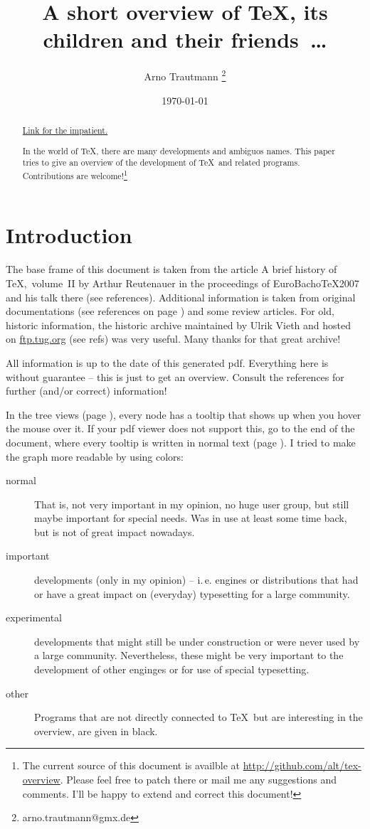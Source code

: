 \documentclass{scrartcl}
\title{A short overview of \TeX, its children and their friends~\dots}
\author{Arno Trautmann \thanks{arno.trautmann@gmx.de}}
\date{\today}
\begin{document}
\maketitle

\begin{abstract}
\centerline{\hyperref[textextview]{Link for the impatient.}}
In the world of \TeX, there are many developments and ambiguos names. This paper tries to give an overview of the development of \TeX\ and related programs. Contributions are welcome!\footnote{The current source of this document is availble at \url{http://github.com/alt/tex-overview}. Please feel free to patch there or mail me any suggestions and comments. I’ll be happy to extend and correct this document!}\\
\end{abstract}

\section*{Introduction}
The base frame of this document is taken from the article \textsf{A brief history of \TeX,~volume~II} by Arthur Reutenauer in the proceedings of \textsf{EuroBacho\TeX 2007} and his talk there (see references). Additional information is taken from original documentations (see references on page \pageref{sec:refs}) and some review articles. For old, historic information, the \textsf{historic archive} maintained by Ulrik Vieth and hosted on \url{ftp.tug.org} (see refs) was very useful. Many thanks for that great archive!

All information is up to the date of this generated pdf. Everything here is without guarantee – this is just to get an overview. Consult the references for further (and/or correct) information! 

In the tree views (page \pageref{sec:tree}), every node has a tooltip that shows up when you hover the mouse over it. If your pdf viewer does not support this, go to the end of the document, where every tooltip is written in normal text (page \pageref{sec:text}). I tried to make the graph more readable by using colors:

\begin{description}
\item[{\color{\normalimportant!70!black} normal}] That is, not very important in my opinion, no huge user group, but still maybe important for special needs. Was in use at least some time back, but is not of great impact nowadays.
\item[{\color{\vip!70!black} important}] developments (only in my opinion) – i.\,e. engines or distributions that had or have a great impact on (everyday) typesetting for a large community.
\item[{\color{\experimental!70!black} experimental}] developments that might still be under construction or were never used by a large community. Nevertheless, these might be very important to the development of other enginges or for use of special typesetting.
\item[{\color{\other!70!black} other}] Programs that are not directly connected to \TeX\ but are interesting in the overview, are given in black.
\end{description}
\end{document}
